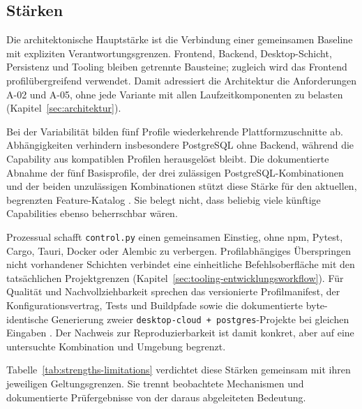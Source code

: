 \subsection{Stärken}
\label{subsec:staerken}

Die architektonische Hauptstärke ist die Verbindung einer gemeinsamen
Baseline mit expliziten Verantwortungsgrenzen. Frontend, Backend,
Desktop-Schicht, Persistenz und Tooling bleiben getrennte Bausteine; zugleich
wird das Frontend profilübergreifend verwendet. Damit adressiert die
Architektur die Anforderungen A-02 und A-05, ohne jede Variante mit allen
Laufzeitkomponenten zu belasten (Kapitel~\ref{sec:architektur}).

Bei der Variabilität bilden fünf Profile wiederkehrende Plattformzuschnitte
ab. Abhängigkeiten verhindern insbesondere PostgreSQL ohne Backend, während
die Capability aus kompatiblen Profilen herausgelöst bleibt. Die dokumentierte
Abnahme der fünf Basisprofile, der drei zulässigen PostgreSQL-Kombinationen und
der beiden unzulässigen Kombinationen stützt diese Stärke für den aktuellen,
begrenzten Feature-Katalog \parencite{kleiveist2026acceptance}. Sie belegt
nicht, dass beliebig viele künftige Capabilities ebenso beherrschbar wären.

Prozessual schafft \texttt{control.py} einen gemeinsamen Einstieg, ohne npm,
Pytest, Cargo, Tauri, Docker oder Alembic zu verbergen. Profilabhängiges
Überspringen nicht vorhandener Schichten verbindet eine einheitliche
Befehlsoberfläche mit den tatsächlichen Projektgrenzen
(Kapitel~\ref{sec:tooling-entwicklungsworkflow}). Für Qualität und
Nachvollziehbarkeit sprechen das versionierte Profilmanifest, der
Konfigurationsvertrag, Tests und Buildpfade sowie die dokumentierte
byte-identische Generierung zweier \texttt{desktop-cloud + postgres}-Projekte
bei gleichen Eingaben \parencite{kleiveist2026acceptance}. Der Nachweis zur
Reproduzierbarkeit ist damit konkret, aber auf eine untersuchte Kombination
und Umgebung begrenzt.

Tabelle~\ref{tab:strengths-limitations} verdichtet diese Stärken gemeinsam mit
ihren jeweiligen Geltungsgrenzen. Sie trennt beobachtete Mechanismen und
dokumentierte Prüfergebnisse von der daraus abgeleiteten Bedeutung.


